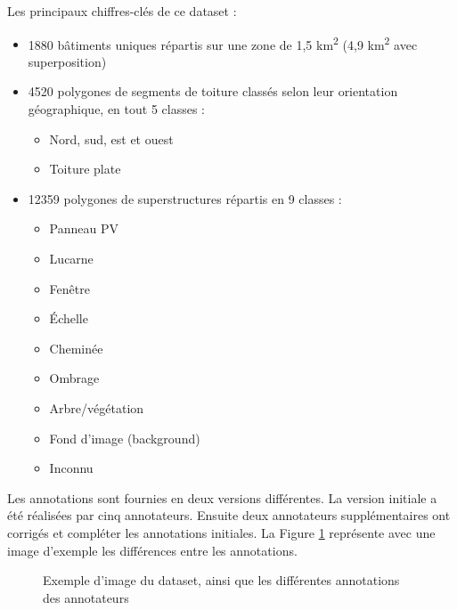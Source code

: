 \par{Les principaux chiffres-clés de ce dataset :}
\begin{itemize}
    \item 1880 bâtiments uniques répartis sur une zone de 1,5 \si{\unit{km^2}} (4,9 \si{\unit{km^2}} avec superposition)
    \item 4520 polygones de segments de toiture classés selon leur orientation géographique, en tout 5 classes :
    \begin{itemize}
        \item Nord, sud, est et ouest
        \item Toiture plate
    \end{itemize}
    \item 12359 polygones de superstructures répartis en 9 classes :
    \begin{itemize}
        \item Panneau PV
        \item Lucarne
        \item Fenêtre
        \item Échelle
        \item Cheminée
        \item Ombrage
        \item Arbre/végétation
        \item Fond d'image (background)
        \item Inconnu
    \end{itemize}
\end{itemize}
\par{Les annotations sont fournies en deux versions différentes. La version initiale a été réalisées par cinq annotateurs. Ensuite deux annotateurs supplémentaires ont corrigés et compléter les annotations initiales. La Figure \ref{fig:rid_dataset_image_sample} représente avec une image d'exemple les différences entre les annotations.}

\begin{figure}[H]
    \caption{Exemple d'image du dataset, ainsi que les différentes annotations des annotateurs \cite{krapf_rid_2021}}
    \label{fig:rid_dataset_image_sample}
\end{figure}

